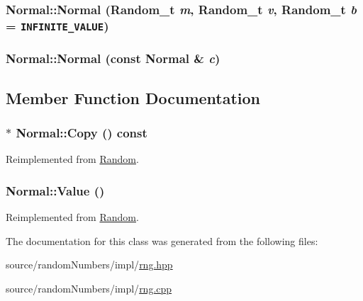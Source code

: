 \hypertarget{classNormal_d217f8c08ba608aa4409f60bb7a8bb9d}{
\subsubsection[{Normal}]{\setlength{\rightskip}{0pt plus 5cm}Normal::Normal ({\bf Random\_\-t} {\em m}, \/  {\bf Random\_\-t} {\em v}, \/  {\bf Random\_\-t} {\em b} = {\tt INFINITE\_\-VALUE})}}
\label{classNormal_d217f8c08ba608aa4409f60bb7a8bb9d}


\hypertarget{classNormal_f79886344f9b8e79820d78aeb68e3e00}{
\subsubsection[{Normal}]{\setlength{\rightskip}{0pt plus 5cm}Normal::Normal (const {\bf Normal} \& {\em c})}}
\label{classNormal_f79886344f9b8e79820d78aeb68e3e00}




\subsection{Member Function Documentation}
\hypertarget{classNormal_e59f996a159efc4b26c6e373f672b050}{
\subsubsection[{Copy}]{ $\ast$ Normal::Copy () const}}
\label{classNormal_e59f996a159efc4b26c6e373f672b050}




Reimplemented from \hyperlink{classRandom_22b2951acd2008e8ff58fae434ab7ac5}{Random}.\hypertarget{classNormal_f9f5b8c8ba6dff8beb660a70935dd99e}{
\subsubsection[{Value}]{ Normal::Value ()}}
\label{classNormal_f9f5b8c8ba6dff8beb660a70935dd99e}




Reimplemented from \hyperlink{classRandom_4d1c2876c5c78104186e241209d0e11e}{Random}.

The documentation for this class was generated from the following files:\begin{CompactItemize}
\item 
source/randomNumbers/impl/\hyperlink{rng_8hpp}{rng.hpp}\item 
source/randomNumbers/impl/\hyperlink{rng_8cpp}{rng.cpp}\end{CompactItemize}
